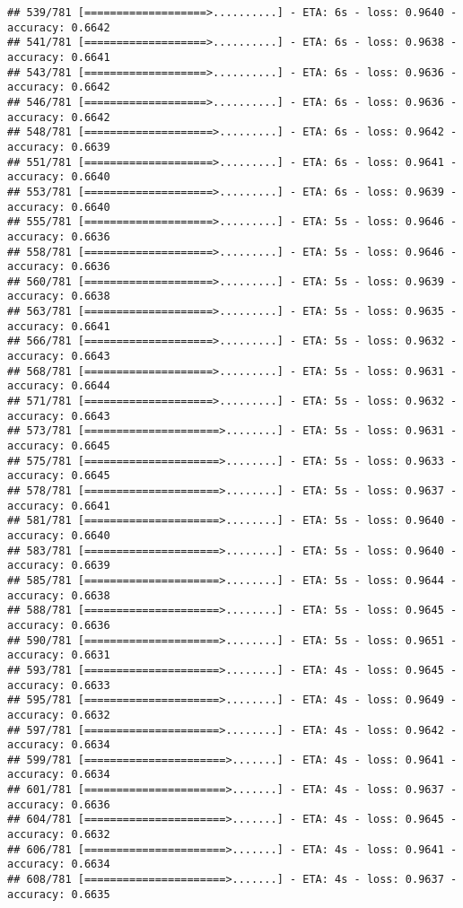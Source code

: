 \documentclass[
]{article}
\begin{document}
\begin{verbatim}
## 539/781 [===================>..........] - ETA: 6s - loss: 0.9640 - accuracy: 0.6642
## 541/781 [===================>..........] - ETA: 6s - loss: 0.9638 - accuracy: 0.6641
## 543/781 [===================>..........] - ETA: 6s - loss: 0.9636 - accuracy: 0.6642
## 546/781 [===================>..........] - ETA: 6s - loss: 0.9636 - accuracy: 0.6642
## 548/781 [====================>.........] - ETA: 6s - loss: 0.9642 - accuracy: 0.6639
## 551/781 [====================>.........] - ETA: 6s - loss: 0.9641 - accuracy: 0.6640
## 553/781 [====================>.........] - ETA: 6s - loss: 0.9639 - accuracy: 0.6640
## 555/781 [====================>.........] - ETA: 5s - loss: 0.9646 - accuracy: 0.6636
## 558/781 [====================>.........] - ETA: 5s - loss: 0.9646 - accuracy: 0.6636
## 560/781 [====================>.........] - ETA: 5s - loss: 0.9639 - accuracy: 0.6638
## 563/781 [====================>.........] - ETA: 5s - loss: 0.9635 - accuracy: 0.6641
## 566/781 [====================>.........] - ETA: 5s - loss: 0.9632 - accuracy: 0.6643
## 568/781 [====================>.........] - ETA: 5s - loss: 0.9631 - accuracy: 0.6644
## 571/781 [====================>.........] - ETA: 5s - loss: 0.9632 - accuracy: 0.6643
## 573/781 [=====================>........] - ETA: 5s - loss: 0.9631 - accuracy: 0.6645
## 575/781 [=====================>........] - ETA: 5s - loss: 0.9633 - accuracy: 0.6645
## 578/781 [=====================>........] - ETA: 5s - loss: 0.9637 - accuracy: 0.6641
## 581/781 [=====================>........] - ETA: 5s - loss: 0.9640 - accuracy: 0.6640
## 583/781 [=====================>........] - ETA: 5s - loss: 0.9640 - accuracy: 0.6639
## 585/781 [=====================>........] - ETA: 5s - loss: 0.9644 - accuracy: 0.6638
## 588/781 [=====================>........] - ETA: 5s - loss: 0.9645 - accuracy: 0.6636
## 590/781 [=====================>........] - ETA: 5s - loss: 0.9651 - accuracy: 0.6631
## 593/781 [=====================>........] - ETA: 4s - loss: 0.9645 - accuracy: 0.6633
## 595/781 [=====================>........] - ETA: 4s - loss: 0.9649 - accuracy: 0.6632
## 597/781 [=====================>........] - ETA: 4s - loss: 0.9642 - accuracy: 0.6634
## 599/781 [======================>.......] - ETA: 4s - loss: 0.9641 - accuracy: 0.6634
## 601/781 [======================>.......] - ETA: 4s - loss: 0.9637 - accuracy: 0.6636
## 604/781 [======================>.......] - ETA: 4s - loss: 0.9645 - accuracy: 0.6632
## 606/781 [======================>.......] - ETA: 4s - loss: 0.9641 - accuracy: 0.6634
## 608/781 [======================>.......] - ETA: 4s - loss: 0.9637 - accuracy: 0.6635

\end{verbatim}
\end{document}
